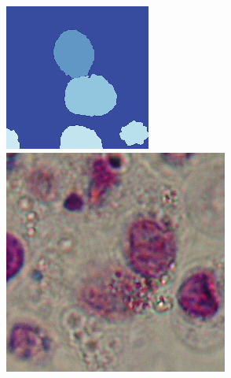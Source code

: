 \begin{figure}[t!]
	\includegraphics[width=0.97\linewidth]{Figures/Chapter2/6c1.png}
	\endminipage\hfill
	\centering	
	\includegraphics[width=0.97\linewidth]{Figures/Chapter2/6a2.png}	

\end{figure}
